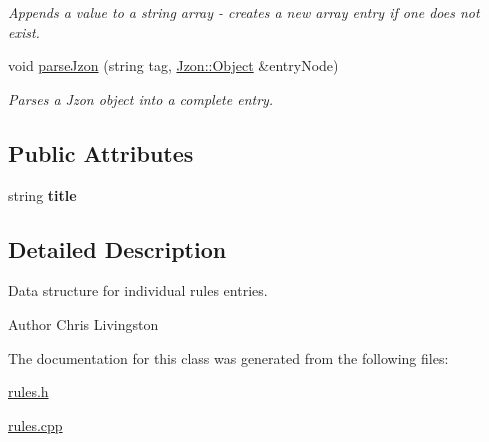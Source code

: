\begin{DoxyCompactItemize}
\begin{DoxyCompactList}\small\item\em Appends a value to a string array -\/ creates a new array entry if one does not exist. \end{DoxyCompactList}\item 
\hypertarget{class_rules_1_1_rules_entry_a152e03eaec3a2110c3c335c95c518186}{void \hyperlink{class_rules_1_1_rules_entry_a152e03eaec3a2110c3c335c95c518186}{parse\-Jzon} (string tag, \hyperlink{class_jzon_1_1_object}{Jzon\-::\-Object} \&entry\-Node)}\label{class_rules_1_1_rules_entry_a152e03eaec3a2110c3c335c95c518186}

\begin{DoxyCompactList}\small\item\em Parses a Jzon object into a complete entry. \end{DoxyCompactList}\end{DoxyCompactItemize}
\subsection*{Public Attributes}
\begin{DoxyCompactItemize}
\item 
\hypertarget{class_rules_1_1_rules_entry_a398a12e3f9bcf59ad968fc5a2601098e}{string {\bfseries title}}\label{class_rules_1_1_rules_entry_a398a12e3f9bcf59ad968fc5a2601098e}

\end{DoxyCompactItemize}


\subsection{Detailed Description}
Data structure for individual rules entries. 

\begin{DoxyAuthor}{Author}
Chris Livingston 
\end{DoxyAuthor}


The documentation for this class was generated from the following files\-:\begin{DoxyCompactItemize}
\item 
\hyperlink{rules_8h}{rules.\-h}\item 
\hyperlink{rules_8cpp}{rules.\-cpp}\end{DoxyCompactItemize}
